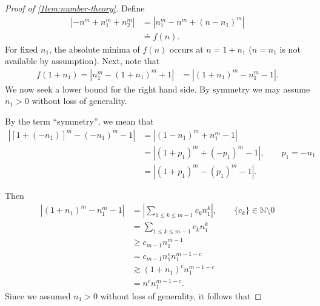 %
%
%
%
\begin{proof}[Proof of \cref{1lem:number-theory}] Define
%
\begin{equation*}
	\begin{split}
		| - n^{m} + n_1^{m} + n_2^{m }|
		& = | n_{1}^{m} - n^{m} + (n-n_{1})^{m}| 
		\\
		& \doteq f(n).
	\end{split}
\end{equation*}
%
%
For fixed $n_1$, the absolute minima
of $f(n)$ occurs at $n = 1+n_{1}$ ($n = n_1$ is not available by assumption). Next, note that
%
%
\begin{equation*}
	\begin{split}
		f(1+ n_{1}) = | n_{1}^{m} - (1 + n_{1})^m + 1 |
		& = | (1 + n_{1} )^{m} - n_{1}^{m} -1 |.
	\end{split}
\end{equation*}
We now seek a lower bound for the right hand side. By symmetry we may assume
$n_1 >0$ without loss of generality.
%
%
\begin{framed}
\begin{remark}
	By the term ``symmetry'', we mean that
	\begin{equation*}
	\begin{split}
	| [1 + (-n_1)]^m - (-n_1)^m -1 |
	& = | (1 - n_1)^m + n_1^m -1 |
	\\
	& = | (1 + p_1)^m + (-p_1)^m -1 |, \qquad p_1 = -n_1
	\\
	& = | (1 + p_1)^m - (p_1)^m -1 |.
	\end{split}
\end{equation*}
%
%
\end{remark}
\end{framed}
%
%
Then 
%
%
\begin{equation*}
	\begin{split}
	| (1 + n_{1} )^{m} - n_{1}^{m} -1 |
	& = | \sum_{1 \le k \le m-1} c_{k} n_1^{k}|, \qquad \{c_k\} \in
	\mathbb{N}\setminus 0
	 \\
	 & = \sum_{1 \le k \le m-1} c_{k} n_1^{k}
	 \\
	 & \ge c_{m-1}  n_1^{m-1}
	 \\
	 & = c_{m-1}  n_1^{c} n_1^{m-1-c}
	 \\
	 & \gtrsim (1 + n_1)^{c}  n_1^{m-1-c}
	 \\
	 & = n^{c} n_1^{m-1-c}. 
 \end{split}
\end{equation*}
%
%
Since we assumed $n_1 >0$ without loss of generality, it follows that 
%

\end{proof}
